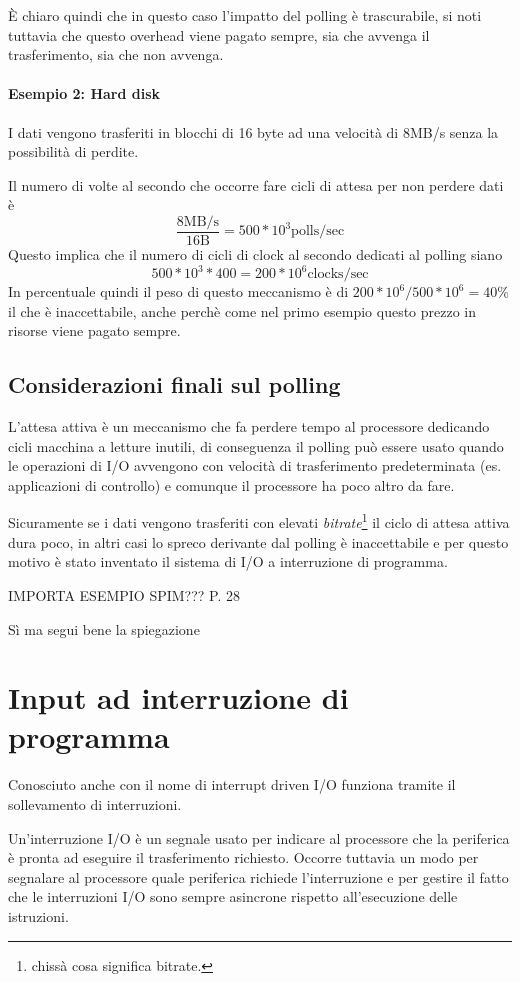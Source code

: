 \documentclass[class=book, crop=false, oneside]{standalone}
\begin{document}
È chiaro quindi che in questo caso l'impatto del polling è trascurabile, si noti tuttavia che questo overhead viene pagato sempre, sia che avvenga il trasferimento, sia che non avvenga.

\paragraph{Esempio 2: Hard disk} I dati vengono trasferiti in blocchi di 16 byte ad una velocità di 8MB/s senza la possibilità di perdite.

Il numero di volte al secondo che occorre fare cicli di attesa per non perdere dati è \[\frac{8\textrm{MB/s}}{16\textrm{B}} = 500*10^{3} \textrm{polls/sec}\]
Questo implica che il numero di cicli di clock al secondo dedicati al polling siano \[ 500*10^{3}*400 = 200*10^{6} \textrm{clocks/sec}\]
In percentuale quindi il peso di questo meccanismo è di \(200*10^{6}/500*10^{6}=40\%\) il che è inaccettabile, anche perchè come nel primo esempio questo prezzo in risorse viene pagato sempre.

\subsection{Considerazioni finali sul polling}
L’attesa attiva è un meccanismo che fa perdere tempo al processore dedicando cicli macchina a letture inutili, di conseguenza il polling può essere usato quando le operazioni di I/O avvengono con velocità di trasferimento predeterminata (es. applicazioni di controllo) e comunque il processore ha poco altro da fare.

Sicuramente se i dati vengono trasferiti con elevati \emph{bitrate}\footnote{chissà cosa significa bitrate.} il ciclo di attesa attiva dura poco, in altri casi lo spreco derivante dal polling è inaccettabile e per questo motivo è stato inventato il sistema di I/O a interruzione di programma.

IMPORTA ESEMPIO SPIM??? P. 28

Sì ma segui bene la spiegazione

\section{Input ad interruzione di programma}
Conosciuto anche con il nome di interrupt driven I/O funziona tramite il sollevamento di interruzioni.

Un’interruzione I/O è un segnale usato per indicare al processore che la periferica è pronta ad eseguire il trasferimento richiesto.
Occorre tuttavia un modo per segnalare al processore quale periferica richiede l’interruzione e per gestire il fatto che le interruzioni I/O sono sempre asincrone rispetto all’esecuzione delle istruzioni.
\end{document}
